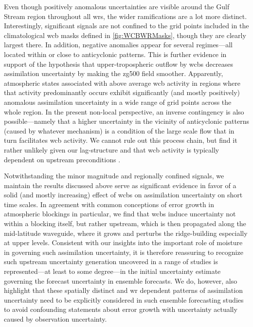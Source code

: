 Even though positively anomalous uncertainties are visible around the Gulf Stream region throughout all \glspl{wr}, the wider ramifications are a lot more distinct. Interestingly, significant signals are not confined to the grid points included in the climatological \gls{wcb} masks defined in \cref{fig:WCBWRMasks}, though they are clearly largest there. In addition, negative anomalies appear for several regimes---all located within or close to anticyclonic patterns. This is further evidence in support of the hypothesis that upper-tropospheric outflow by \glspl{wcb} decreases assimilation uncertainty by making the \gls{zg500} field smoother. Apparently, atmospheric states associated with above average \gls{wcb} activity in regions where that activity predominantly occurs exhibit significantly (and mostly positively) anomalous assimilation uncertainty in a wide range of grid points across the whole region. In the present non-local perspective, an inverse contingency is also possible---namely that a higher uncertainty in the vicinity of anticyclonic patterns (caused by whatever mechanism) is a condition of the large scale flow that in turn facilitates \gls{wcb} activity. We cannot rule out this process chain, but find it rather unlikely given our lag-structure and that \gls{wcb} activity is typically dependent on upstream preconditions \parencite{schaflerImpactInflowMoisture2015, oertelSensitivitiesWarmConveyor2025}.

Notwithstanding the minor magnitude and regionally confined signals, we maintain the results discussed above serve as significant evidence in favor of a solid (and mostly increasing) effect of \glspl{wcb} on assimilation uncertainty on short time scales. In agreement with common conceptions of error growth in atmospheric blockings in particular, we find that \glspl{wcb} induce uncertainty not within a blocking itself, but rather upstream, which is then propagated along the mid-latitude waveguide, where it grows and perturbs the ridge-building especially at upper levels. Consistent with our insights into the important role of moisture in governing such assimilation uncertainty, it is therefore reassuring to recognize such upstream uncertainty generation uncovered in a range of studies is represented---at least to some degree---in the initial uncertainty estimate governing the forecast uncertainty in ensemble forecasts. We do, however, also highlight that these spatially distinct and \gls{wr} dependent patterns of assimilation uncertainty need to be explicitly considered in such ensemble forecasting studies to avoid confounding statements about error growth with uncertainty actually caused by observation uncertainty.


